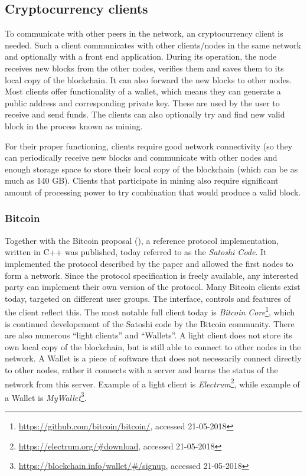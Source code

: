 \subsection{Cryptocurrency clients}\label{sec:eth-clients}
To communicate with other peers in the network, an cryptocurrency client is needed. Such a client communicates with other clients/nodes in the same network and optionally with a front end application. During its operation, the node receives new blocks from the other nodes, verifies them and saves them to its local copy of the blockchain. It can also forward the new blocks to other nodes. Most clients offer functionality of a wallet, which means they can generate a public address and corresponding private key. These are used by the user to receive and send funds. The clients can also optionally try and find new valid block in the process known as mining.

For their proper functioning, clients require good network connectivity (so they can periodically receive new blocks and communicate with other nodes and enough storage space to store their local copy of the blockchain (which can be as much as 140 GB\footnotemark). Clients that participate in mining also require significant amount of processing power to try combination that would produce a valid block.
% 

\subsubsection{Bitcoin}
Together with the Bitcoin proposal (\cite{NakamotoBitcoin:System}), a reference protocol implementation, written in C++ was published, today referred to as the \textit{Satoshi Code}\footnotemark. It implemented the protocol described by the paper and allowed the first nodes to form a network. Since the protocol specification is freely available, any interested party can implement their own version of the protocol.
% 
% 
Many Bitcoin clients exist today, targeted on different user groups. The interface, controls and features of the client reflect this. The most notable full client today is \textit{Bitcoin Core}\footnote{\url{https://github.com/bitcoin/bitcoin/}, accessed 21-05-2018}, which is continued developement of the Satoshi code by the Bitcoin community. There are also numerous ``light clients'' and ``Wallets''. A light client does not store its own local copy of the blockchain, but is still able to connect to other nodes in the network. A Wallet is a piece of software that does not necessarily connect directly to other nodes, rather it connects with a server and learns the status of the network from this server. Example of a light client is \textit{Electrum}\footnote{\url{https://electrum.org/\#download}, accessed 21-05-2018}, while example of a Wallet is \textit{MyWallet}\footnote{\url{https://blockchain.info/wallet/\#/signup}, accessed 21-05-2018}.

